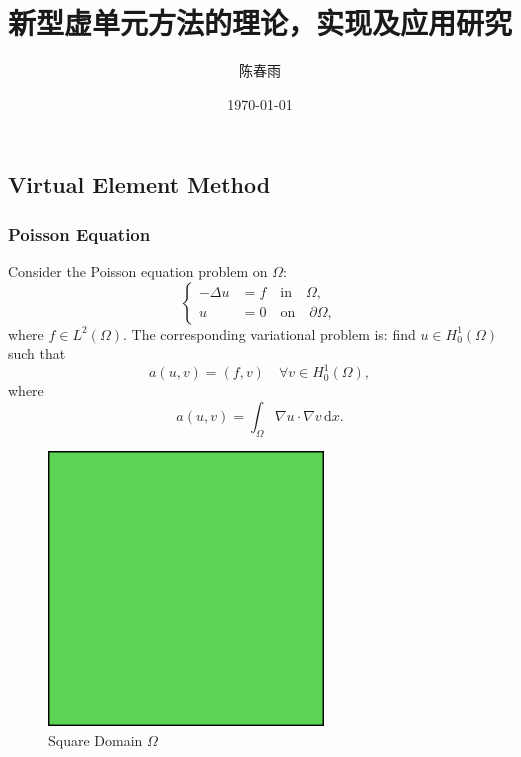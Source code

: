 \documentclass[notheorems,serif]{beamer}
\begin{document}
\begin{CJK}{UTF8}{gkai}

\title{新型虚单元方法的理论，实现及应用研究}
\author{陈春雨}
 
\date
{
    \today
}

\frame[plain]{\titlepage}
\section{Virtual Element Method}
\begin{frame}\frametitle{Poisson Equation}
\begin{minipage}[b]{0.6\linewidth}
Consider the Poisson equation problem on $\Omega$:
$$
\left\{
\begin{aligned}
-\Delta u &= f \quad \text{in} \quad \Omega, \\
u &= 0 \quad \text{on} \quad \partial \Omega,
\end{aligned}
\right.
$$
where $f \in L^2(\Omega)$. The corresponding variational problem is: find $u \in H^1_0(\Omega)$ such that
$$
a(u, v) = (f, v) \quad \forall v \in H^1_0(\Omega),
$$
where 
$$
a(u, v) = \int_{\Omega} \nabla u \cdot \nabla v \, \mathrm{d} x.
$$
\end{minipage}
\hfill
\begin{minipage}[b]{0.38\linewidth}
    \centering
    \begin{figure}[htpb]
        \centering
        \includegraphics[width=0.65\textwidth]{../figures/domain_quad.pdf}
        \caption{Square Domain $\Omega$}
    \end{figure}
\end{minipage}


\end{frame}
\end{CJK}
\end{document}
